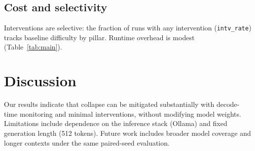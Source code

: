 \documentclass{article}
\begin{document}
\begin{table}[t]
\centering
\small
\setlength{\tabcolsep}{3pt}
\caption{Collapse reduction across five pillars under baseline vs.\ controlled decoding (Gemma 7B, Ollama, 512 tokens fixed).
Rates show Wilson 95\% CIs; $\Delta$/RR/OR use paired bootstrap over seeds (B=20{,}000).}
\label{tab:main}
\end{table}

\subsection{Cost and selectivity}
Interventions are selective: the fraction of runs with any intervention (\texttt{intv\_rate})
tracks baseline difficulty by pillar.
Runtime overhead is modest (Table~\ref{tab:main}).

\section{Discussion}
Our results indicate that collapse can be mitigated substantially with decode-time monitoring and minimal interventions,
without modifying model weights.
Limitations include dependence on the inference stack (Ollama) and fixed generation length (512 tokens).
Future work includes broader model coverage and longer contexts under the same paired-seed evaluation.
\end{document}
